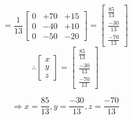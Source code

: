 \documentclass[a4paper, 12pt]{report}
\begin{document}
{\begin{equation*}
      =\frac {1}{13}
      \begin{bmatrix}
      0&+70&+15\\
      0&-40&+10\\
      0&-50&-20
      \end{bmatrix}
      =
      \begin{bmatrix}
      \frac{85}{13}\\
      \frac {-30}{13}\\
      \frac {-70}{13}
      \end{bmatrix}
      \end{equation*}
      \begin{equation*}
       \therefore
      \begin{bmatrix}
      x\\
      y\\
      z
      \end{bmatrix}
      =
      \begin{bmatrix}
      \frac{85}{13}\\
      \frac{-30}{13}\\
      \frac{-70}{13}
      \end{bmatrix}
      \end{equation*}
      
      \begin{equation*}
      \Rightarrow
      x= \frac {85}{13},
      y= \frac {-30}{13},
      z= \frac {-70}{13}
      \end{equation*}
      
}
\end{document}
